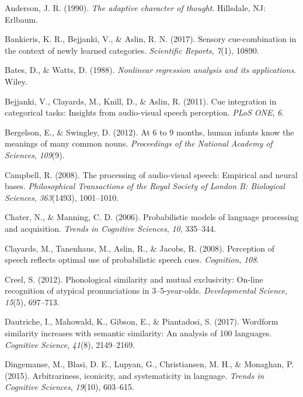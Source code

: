 \documentclass[english,floatsintext,man]{apa6}
\theoremstyle{definition}
\theoremstyle{definition}
\theoremstyle{definition}
\theoremstyle{remark}
\begin{document}
\hypertarget{refs}{}
\hypertarget{ref-anderson90}{}
Anderson, J. R. (1990). \emph{The adaptive character of thought}.
Hillsdale, NJ: Erlbaum.

\hypertarget{ref-Bankieris17}{}
Bankieris, K. R., Bejjanki, V., \& Aslin, R. N. (2017). Sensory
cue-combination in the context of newly learned categories.
\emph{Scientific Reports}, \emph{7}(1), 10890.

\hypertarget{ref-bates88}{}
Bates, D., \& Watts, D. (1988). \emph{Nonlinear regression analysis and
its applications}. Wiley.

\hypertarget{ref-bejjanki2011}{}
Bejjanki, V., Clayards, M., Knill, D., \& Aslin, R. (2011). Cue
integration in categorical tasks: Insights from audio-visual speech
perception. \emph{PLoS ONE}, \emph{6}.

\hypertarget{ref-bergelson2012}{}
Bergelson, E., \& Swingley, D. (2012). At 6 to 9 months, human infants
know the meanings of many common nouns. \emph{Proceedings of the
National Academy of Sciences}, \emph{109}(9).

\hypertarget{ref-Campbell2008}{}
Campbell, R. (2008). The processing of audio-visual speech: Empirical
and neural bases. \emph{Philosophical Transactions of the Royal Society
of London B: Biological Sciences}, \emph{363}(1493), 1001--1010.

\hypertarget{ref-chater06}{}
Chater, N., \& Manning, C. D. (2006). Probabilistic models of language
processing and acquisition. \emph{Trends in Cognitive Sciences},
\emph{10}, 335--344.

\hypertarget{ref-clayard08}{}
Clayards, M., Tanenhaus, M., Aslin, R., \& Jacobs, R. (2008). Perception
of speech reflects optimal use of probabilistic speech cues.
\emph{Cognition}, \emph{108}.

\hypertarget{ref-Creel2012}{}
Creel, S. (2012). Phonological similarity and mutual exclusivity:
On-line recognition of atypical pronunciations in 3--5-year-olds.
\emph{Developmental Science}, \emph{15}(5), 697--713.

\hypertarget{ref-dautriche17}{}
Dautriche, I., Mahowald, K., Gibson, E., \& Piantadosi, S. (2017).
Wordform similarity increases with semantic similarity: An analysis of
100 languages. \emph{Cognitive Science}, \emph{41}(8), 2149--2169.

\hypertarget{ref-dingemanse2015}{}
Dingemanse, M., Blasi, D. E., Lupyan, G., Christiansen, M. H., \&
Monaghan, P. (2015). Arbitrariness, iconicity, and systematicity in
language. \emph{Trends in Cognitive Sciences}, \emph{19}(10), 603--615.
\end{document}
